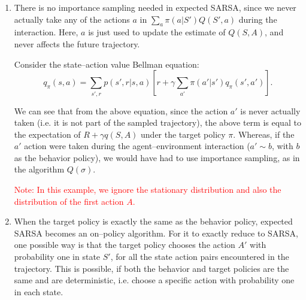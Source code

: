 \documentclass[a4paper, 10pt]{article}
\begin{document}
\begin{enumerate}
\item There is no importance sampling needed in expected SARSA, since we never actually take any of the actions $a$ in $\sum_a \pi(a|S') Q(S', a)$ during the interaction. Here, $a$ is just used to update the estimate of $Q(S, A)$, and never affects the future trajectory.

  Consider the state--action value Bellman equation:
  \begin{equation*}
    q_\pi(s, a) = \sum_{s', r} p(s', r | s, a) \left[ r + \gamma \sum_{a'} \pi(a'|s') q_\pi(s', a') \right].
  \end{equation*}

  We can see that from the above equation, since the action $a'$ is never actually taken (i.e. it is not part of the sampled trajectory), the above term is equal to the expectation of $R + \gamma q(S, A)$ under the target policy $\pi$. Whereas, if the $a'$ action were taken during the agent--environment interaction ($a' \sim b$, with $b$ as the behavior policy), we would have had to use importance sampling, as in the algorithm $Q(\sigma)$.

  \textcolor{red}{Note: In this example, we ignore the stationary distribution and also the distribution of the first action $A$.}
  
\item When the target policy is exactly the same as the behavior policy, expected SARSA becomes an on--policy algorithm. For it to exactly reduce to SARSA, one possible way is that the target policy chooses the action $A'$ with probability one in state $S'$, for all the state action pairs encountered in the trajectory. This is possible, if both the behavior and target policies are the same and are deterministic, i.e. choose a specific action with probability one in each state.
\end{enumerate}
    
\end{document}
